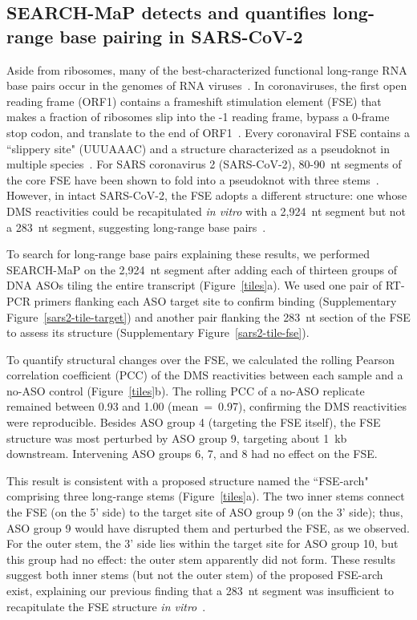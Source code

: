 \documentclass[main.tex]{subfiles}
\begin{document}
\subsection{SEARCH-MaP detects and quantifies long-range base pairing in SARS-CoV-2}

Aside from ribosomes, many of the best-characterized functional long-range RNA base pairs occur in the genomes of RNA viruses~\cite{Nicholson2014}.
In coronaviruses, the first open reading frame (ORF1) contains a frameshift stimulation element (FSE) that makes a fraction of ribosomes slip into the -1 reading frame, bypass a 0-frame stop codon, and translate to the end of ORF1~\cite{Plant2008}.
Every coronaviral FSE contains a ``slippery site" (UUUAAAC) and a structure characterized as a pseudoknot in multiple species~\cite{Brierley1989,Herald1993,Plant2005b}.
For SARS coronavirus 2 (SARS-CoV-2), 80-90~nt segments of the core FSE have been shown to fold into a pseudoknot with three stems~\cite{KZhang2021,Roman2021,Jones2022}.
However, in intact SARS-CoV-2, the FSE adopts a different structure: one whose DMS reactivities could be recapitulated \textit{in vitro} with a 2,924~nt segment but not a 283~nt segment, suggesting long-range base pairs~\cite{Lan2022}.

To search for long-range base pairs explaining these results, we performed SEARCH-MaP on the 2,924~nt segment after adding each of thirteen groups of DNA ASOs tiling the entire transcript (Figure~\ref{tiles}a).
We used one pair of RT-PCR primers flanking each ASO target site to confirm binding (Supplementary Figure~\ref{sars2-tile-target}) and another pair flanking the 283~nt section of the FSE to assess its structure (Supplementary Figure~\ref{sars2-tile-fse}).

To quantify structural changes over the FSE, we calculated the rolling Pearson correlation coefficient (PCC) of the DMS reactivities between each sample and a no-ASO control (Figure~\ref{tiles}b).
The rolling PCC of a no-ASO replicate remained between 0.93 and 1.00 (mean~=~0.97), confirming the DMS reactivities were reproducible.
Besides ASO group 4 (targeting the FSE itself), the FSE structure was most perturbed by ASO group 9, targeting about 1~kb downstream.
Intervening ASO groups 6, 7, and 8 had no effect on the FSE.

This result is consistent with a proposed structure named the ``FSE-arch"~\cite{Ziv2020} comprising three long-range stems (Figure~\ref{tiles}a).
The two inner stems connect the FSE (on the 5' side) to the target site of ASO group 9 (on the 3' side); thus, ASO group 9 would have disrupted them and perturbed the FSE, as we observed.
For the outer stem, the 3' side lies within the target site for ASO group 10, but this group had no effect: the outer stem apparently did not form.
These results suggest both inner stems (but not the outer stem) of the proposed FSE-arch~\cite{Ziv2020} exist, explaining our previous finding that a 283~nt segment was insufficient to recapitulate the FSE structure \textit{in vitro}~\cite{Lan2022}.
\end{document}
